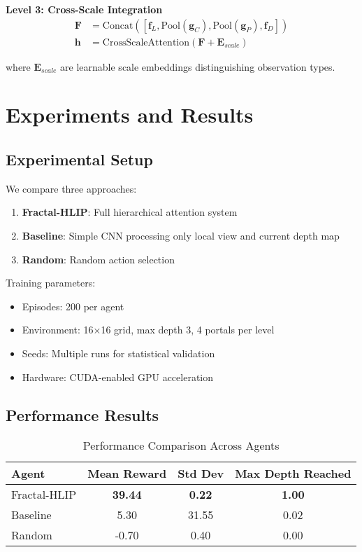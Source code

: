 \documentclass[11pt,a4paper]{article}
\begin{document}
\textbf{Level 3: Cross-Scale Integration}
\begin{align}
\mathbf{F} &= \text{Concat}([\mathbf{f}_L, \text{Pool}(\mathbf{g}_C), \text{Pool}(\mathbf{g}_P), \mathbf{f}_D]) \\
\mathbf{h} &= \text{CrossScaleAttention}(\mathbf{F} + \mathbf{E}_{scale})
\end{align}

where $\mathbf{E}_{scale}$ are learnable scale embeddings distinguishing observation types.

\section{Experiments and Results}

\subsection{Experimental Setup}

We compare three approaches:
\begin{enumerate}
    \item \textbf{Fractal-HLIP}: Full hierarchical attention system
    \item \textbf{Baseline}: Simple CNN processing only local view and current depth map
    \item \textbf{Random}: Random action selection
\end{enumerate}

Training parameters:
\begin{itemize}
    \item Episodes: 200 per agent
    \item Environment: 16×16 grid, max depth 3, 4 portals per level
    \item Seeds: Multiple runs for statistical validation
    \item Hardware: CUDA-enabled GPU acceleration
\end{itemize}

\subsection{Performance Results}

\begin{table}[h]
\centering
\caption{Performance Comparison Across Agents}
\label{tab:results}
\begin{tabular}{lccc}
\toprule
Agent & Mean Reward & Std Dev & Max Depth Reached \\
\midrule
Fractal-HLIP & \textbf{39.44} & \textbf{0.22} & \textbf{1.00} \\
Baseline & 5.30 & 31.55 & 0.02 \\
Random & -0.70 & 0.40 & 0.00 \\
\bottomrule
\end{tabular}
\end{table}
\end{document}
